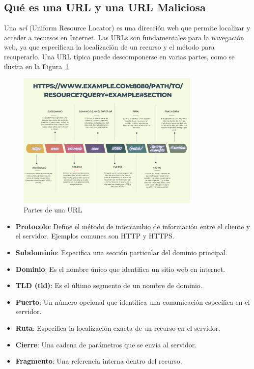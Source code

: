 \subsection{Qué es una URL y una URL Maliciosa}

Una \textit{\gls{url}} (Uniform Resource Locator) es una dirección web que permite localizar y acceder a recursos en Internet. Las URLs son fundamentales para la navegación web, ya que especifican la localización de un recurso y el método para recuperarlo. Una URL típica puede descomponerse en varias partes, como se ilustra en la Figura~\ref{fig:partes_url}.

\begin{figure}[H]
    \centering
    \includegraphics[width=0.8\textwidth]{urlPartes.png}
    \caption{Partes de una URL}
    \label{fig:partes_url}
\end{figure}

\begin{itemize}
    \item \textbf{Protocolo}: Define el método de intercambio de información entre el cliente y el servidor. Ejemplos comunes son HTTP y HTTPS.
    \item \textbf{Subdominio}: Especifica una sección particular del dominio principal.
    \item \textbf{Dominio}: Es el nombre único que identifica un sitio web en internet.
    \item \textbf{TLD (\gls{tld})}: Es el último segmento de un nombre de dominio.
    \item \textbf{Puerto}: Un número opcional que identifica una comunicación específica en el servidor.
    \item \textbf{Ruta}: Especifica la localización exacta de un recurso en el servidor.
    \item \textbf{Cierre}: Una cadena de parámetros que se envía al servidor.
    \item \textbf{Fragmento}: Una referencia interna dentro del recurso.
\end{itemize}

